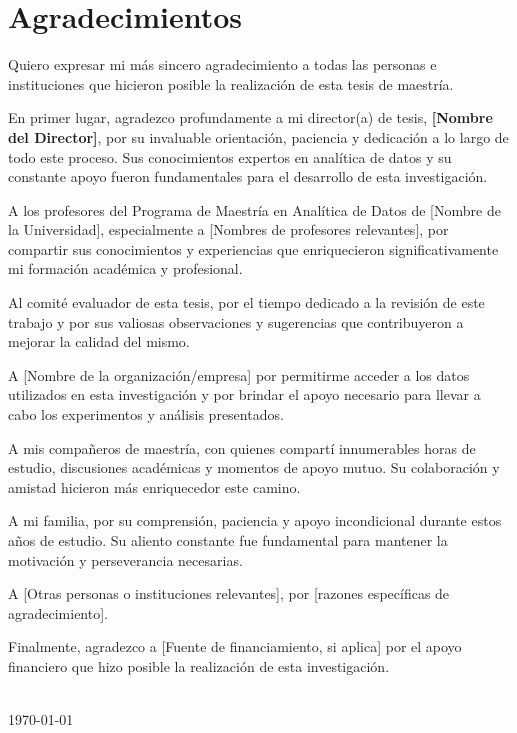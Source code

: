 
\chapter*{Agradecimientos}

Quiero expresar mi más sincero agradecimiento a todas las personas e instituciones que hicieron posible la realización de esta tesis de maestría.

En primer lugar, agradezco profundamente a mi director(a) de tesis, \textbf{[Nombre del Director]}, por su invaluable orientación, paciencia y dedicación a lo largo de todo este proceso. Sus conocimientos expertos en analítica de datos y su constante apoyo fueron fundamentales para el desarrollo de esta investigación.

A los profesores del Programa de Maestría en Analítica de Datos de [Nombre de la Universidad], especialmente a [Nombres de profesores relevantes], por compartir sus conocimientos y experiencias que enriquecieron significativamente mi formación académica y profesional.

Al comité evaluador de esta tesis, por el tiempo dedicado a la revisión de este trabajo y por sus valiosas observaciones y sugerencias que contribuyeron a mejorar la calidad del mismo.

A [Nombre de la organización/empresa] por permitirme acceder a los datos utilizados en esta investigación y por brindar el apoyo necesario para llevar a cabo los experimentos y análisis presentados.

A mis compañeros de maestría, con quienes compartí innumerables horas de estudio, discusiones académicas y momentos de apoyo mutuo. Su colaboración y amistad hicieron más enriquecedor este camino.

A mi familia, por su comprensión, paciencia y apoyo incondicional durante estos años de estudio. Su aliento constante fue fundamental para mantener la motivación y perseverancia necesarias.

A [Otras personas o instituciones relevantes], por [razones específicas de agradecimiento].

Finalmente, agradezco a [Fuente de financiamiento, si aplica] por el apoyo financiero que hizo posible la realización de esta investigación.

\vspace{1cm}

\begin{flushright}
 \\
\today
\end{flushright}

\newpage

